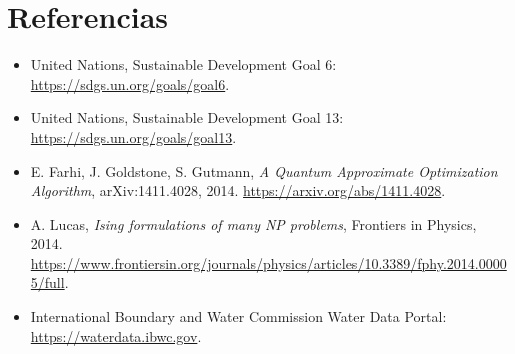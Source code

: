 \documentclass[11pt,letterpaper]{article}
\begin{document}
\section*{Referencias}

\begingroup
\sloppy
\begin{itemize}
  \item United Nations, Sustainable Development Goal 6: \url{https://sdgs.un.org/goals/goal6}.
  \item United Nations, Sustainable Development Goal 13: \url{https://sdgs.un.org/goals/goal13}.
  \item E. Farhi, J. Goldstone, S. Gutmann, \textit{A Quantum Approximate Optimization Algorithm}, arXiv:1411.4028, 2014. \url{https://arxiv.org/abs/1411.4028}.
  \item A. Lucas, \textit{Ising formulations of many NP problems}, Frontiers in Physics, 2014. \url{https://www.frontiersin.org/journals/physics/articles/10.3389/fphy.2014.00005/full}.
  \item International Boundary and Water Commission Water Data Portal: \url{https://waterdata.ibwc.gov}.
\end{itemize}
\endgroup
\end{document}
